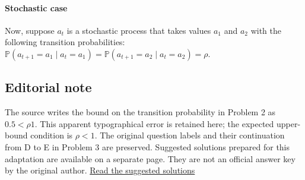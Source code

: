 \documentclass{article}
\begin{document}

\paragraph{Stochastic case} Now, suppose $a_{t}$ is a stochastic process that takes values $a_{1}$ and $a_{2}$ with the following transition probabilities: $\mathbb{P}\left(a_{t+1}=a_{1}\mid a_{t}=a_{1}\right) =\mathbb{P}\left(a_{t+1}=a_{2}\mid a_{t}=a_{2}\right) =\rho.$


\subsection*{Editorial note}
The source writes the bound on the transition probability in Problem 2 as $0.5<\rho 1$. This apparent typographical error is retained here; the expected upper-bound condition is $\rho<1$. The original question labels and their continuation from D to E in Problem 3 are preserved. Suggested solutions prepared for this adaptation are available on a separate page. They are not an official answer key by the original author.
\href{solutions.tex}{Read the suggested solutions}
\end{document}
